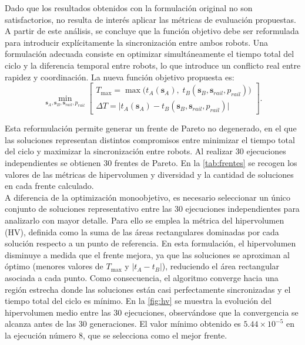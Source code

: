 Dado que los resultados obtenidos con la formulación original no son satisfactorios, no resulta de interés aplicar las métricas de 
evaluación propuestas. A partir de este análisis, se concluye que la función objetivo debe ser reformulada para 
introducir explícitamente la sincronización entre ambos robots. Una formulación adecuada consiste en optimizar simultáneamente el 
tiempo total del ciclo y la diferencia temporal entre robots, lo que introduce un conflicto real entre rapidez y coordinación. 
La nueva función objetivo propuesta es:
\begin{equation}
\min_{\mathbf{s}_A,\mathbf{s}_B,\mathbf{s}_{rail},p_{rail}}
\left[
\begin{array}{c}
T_{\max} = \max\big(t_A(\mathbf{s}_A),\; t_B(\mathbf{s}_B,\mathbf{s}_{rail},p_{rail})\big)\\
\Delta T = \big|t_A(\mathbf{s}_A) - t_B(\mathbf{s}_B,\mathbf{s}_{rail},p_{rail})\big|
\end{array}
\right].
\end{equation}

Esta reformulación permite generar un frente de Pareto no degenerado, en el que las soluciones representan distintos compromisos 
entre minimizar el tiempo total del ciclo y maximizar la sincronización entre robots. Al realizar 30 ejecuciones independientes 
se obtienen 30 frentes de Pareto. En la \autoref{tab:frentes} se recogen los valores de las métricas de hipervolumen 
y diversidad y la cantidad de soluciones en cada frente calculado. \\

A diferencia de la optimización monoobjetivo, es necesario seleccionar un único conjunto de
soluciones representativo entre las 30 ejecuciones independientes para analizarlo con mayor
detalle. Para ello se emplea la métrica del hipervolumen (HV), definida como la suma de las áreas
rectangulares dominadas por cada solución respecto a un punto de referencia. En esta formulación,
el hipervolumen disminuye a medida que el frente mejora, ya que las soluciones se
aproximan al óptimo (menores valores de $T_{\max}$ y $|t_A - t_B|$), reduciendo el área rectangular
asociada a cada punto. Como consecuencia, el algoritmo converge hacia una región estrecha donde las
soluciones están casi perfectamente sincronizadas y el tiempo total del ciclo es mínimo.
En la \autoref{fig:hv} se muestra la evolución del hipervolumen medio entre las 30 ejecuciones,
observándose que la convergencia se alcanza antes de las 30 generaciones. El valor mínimo obtenido
es $5.44\times 10^{-5}$ en la ejecución número 8, que se selecciona como el mejor frente.

